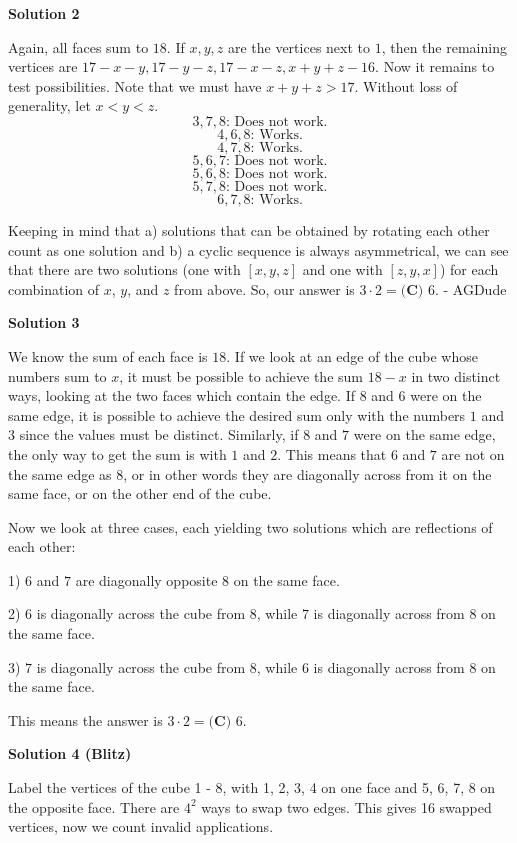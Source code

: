 \begin{enumerate}
\textbf{Solution 2}

Again, all faces sum to $18.$ If $x,y,z$ are the vertices next to $1$, then the remaining vertices are $17-x-y, 17-y-z, 17-x-z, x+y+z-16.$ Now it remains to test possibilities. Note that we must have $x+y+z>17.$ Without loss of generality, let $x<y<z.$
 \[3,7,8\text{: Does not work.}\] 
 \[4,6,8\text{: Works.}\]
 \[4,7,8\text{: Works.}\] 
 \[5,6,7\text{: Does not work.}\]
 \[5,6,8\text{: Does not work.}\]
 \[5,7,8\text{: Does not work.}\]
 \[6,7,8\text{: Works.}\]

 Keeping in mind that a) solutions that can be obtained by rotating each other count as one solution and b) a cyclic sequence is always asymmetrical, we can see that there are two solutions (one with $[x, y, z]$ and one with $[z, y, x]$) for each combination of $x$, $y$, and $z$ from above. So, our answer is $3\cdot 2=\boxed{\textbf{(C) }6.}$ - AGDude

 



\textbf{Solution 3}

We know the sum of each face is $18.$ If we look at an edge of the cube whose numbers sum to $x$, it must be possible to achieve the sum $18-x$ in two distinct ways, looking at the two faces which contain the edge. If $8$ and $6$ were on the same edge, it is possible to achieve the desired sum only with the numbers $1$ and $3$ since the values must be distinct. Similarly, if $8$ and $7$ were on the same edge, the only way to get the sum is with $1$ and $2$. This means that $6$ and $7$ are not on the same edge as $8$, or in other words they are diagonally across from it on the same face, or on the other end of the cube.

 Now we look at three cases, each yielding two solutions which are reflections of each other:

 1) $6$ and $7$ are diagonally opposite $8$ on the same face.

 2) $6$ is diagonally across the cube from $8$, while $7$ is diagonally across from $8$ on the same face.

 3) $7$ is diagonally across the cube from $8$, while $6$ is diagonally across from $8$ on the same face.

 This means the answer is $3\cdot 2=\boxed{\textbf{(C) }6.}$




\textbf{Solution 4 (Blitz)}

Label the vertices of the cube 1 - 8, with 1, 2, 3, 4 on one face and 5, 6, 7, 8 on the opposite face. There are \( 4^2 \) ways to swap two edges. This gives 16 swapped vertices, now we count invalid applications.


\end{enumerate}
